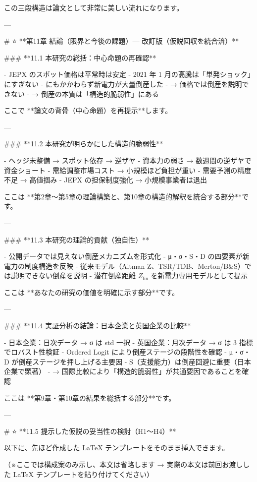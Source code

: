 この三段構造は論文として非常に美しい流れになります。

---

# ⭐ **第11章 結論（限界と今後の課題）— 改訂版（仮説回収を統合済）**

### **11.1 本研究の総括：中心命題の再確認**

- JEPX のスポット価格は平常時は安定  
- 2021 年 1 月の高騰は「単発ショック」にすぎない  
- にもかかわらず新電力が大量倒産した  
- → 価格では倒産を説明できない  
- → 倒産の本質は「構造的脆弱性」にある  

ここで **論文の背骨（中心命題）を再提示**します。

---

### **11.2 本研究が明らかにした構造的脆弱性**

- ヘッジ未整備 → スポット依存 → 逆ザヤ  
- 資本力の弱さ → 数週間の逆ザヤで資金ショート  
- 需給調整市場コスト → 小規模ほど負担が重い  
- 需要予測の精度不足 → 高値掴み  
- JEPX の担保制度強化 → 小規模事業者は退出  

ここは **第2章〜第5章の理論構築と、第10章の構造的解釈を統合する部分**です。

---

### **11.3 本研究の理論的貢献（独自性）**

- 公開データでは見えない倒産メカニズムを形式化  
- μ・σ・S・D の四要素が新電力の制度構造を反映  
- 従来モデル（Altman Z、TSR/TDB、Merton/B&S）では説明できない倒産を説明  
- 潜在倒産距離 \(Z_{\text{lin}}\) を新電力専用モデルとして提示  

ここは **あなたの研究の価値を明確に示す部分**です。

---

### **11.4 実証分析の結論：日本企業と英国企業の比較**

- 日本企業：日次データ → σ は std 一択  
- 英国企業：月次データ → σ は 3 指標でロバスト性検証  
- Ordered Logit により倒産ステージの段階性を確認  
- μ・σ・D が倒産ステージを押し上げる主要因  
- S（支援能力）は倒産回避に重要（日本企業で顕著）  
- → 国際比較により「構造的脆弱性」が共通要因であることを確認  

ここは **第9章・第10章の結果を総括する部分**です。

---

# ⭐ **11.5 提示した仮説の妥当性の検討（H1〜H4）**

以下に、先ほど作成した LaTeX テンプレートをそのまま挿入できます。

（※ここでは構成案のみ示し、本文は省略します  
→ 実際の本文は前回お渡しした LaTeX テンプレートを貼り付けてください）

